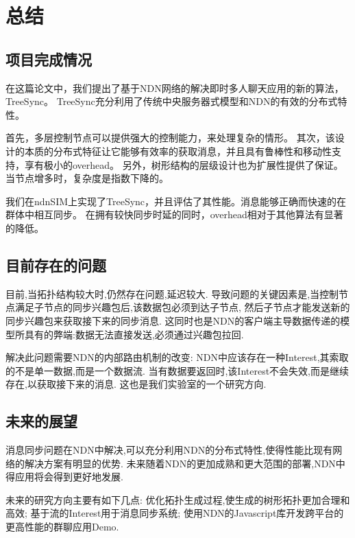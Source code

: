 \chapter{总结}
\label{chapter:conclude}

\section{项目完成情况}

在这篇论文中，我们提出了基于NDN网络的解决即时多人聊天应用的新的算法，TreeSync。
TreeSync充分利用了传统中央服务器式模型和NDN的有效的分布式特性。

首先，多层控制节点可以提供强大的控制能力，来处理复杂的情形。
其次，该设计的本质的分布式特征让它能够有效率的获取消息，并且具有鲁棒性和移动性支持，享有极小的overhead。
另外，树形结构的层级设计也为扩展性提供了保证。当节点增多时，复杂度是指数下降的。

我们在ndnSIM上实现了TreeSync，并且评估了其性能。消息能够正确而快速的在群体中相互同步。
在拥有较快同步时延的同时，overhead相对于其他算法有显著的降低。

\section{目前存在的问题}

目前,当拓扑结构较大时,仍然存在问题,延迟较大.
导致问题的关键因素是,当控制节点满足子节点的同步兴趣包后,该数据包必须到达子节点,
然后子节点才能发送新的同步兴趣包来获取接下来的同步消息.
这同时也是NDN的客户端主导数据传递的模型所具有的弊端:数据无法直接发送,必须通过兴趣包拉回.

解决此问题需要NDN的内部路由机制的改变:
NDN中应该存在一种Interest,其索取的不是单一数据,而是一个数据流.
当有数据要返回时,该Interest不会失效,而是继续存在,以获取接下来的消息.
这也是我们实验室的一个研究方向.

\section{未来的展望}

消息同步问题在NDN中解决,可以充分利用NDN的分布式特性,使得性能比现有网络的解决方案有明显的优势.
未来随着NDN的更加成熟和更大范围的部署,NDN中得应用将会得到更好地发展.

未来的研究方向主要有如下几点:
优化拓扑生成过程,使生成的树形拓扑更加合理和高效;
基于流的Interest用于消息同步系统;
使用NDN的Javascript库开发跨平台的更高性能的群聊应用Demo.
